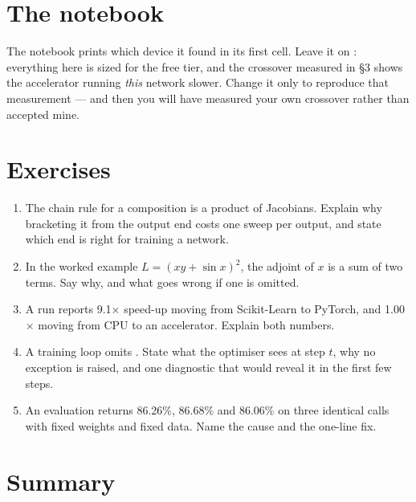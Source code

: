 \documentclass[11pt,a4paper]{article}
\begin{document}
\section{The notebook}

\begin{trybox}[title={What to change}]
The notebook prints which device it found in its first cell. Leave it on
: everything here is sized for the free tier, and the crossover
measured in \S3 shows the accelerator running \emph{this} network slower.
Change it only to reproduce that measurement --- and then you will have
measured your own crossover rather than accepted mine.
\end{trybox}

\section{Exercises}

\begin{enumerate}[leftmargin=1.6em,itemsep=4pt]
  \item The chain rule for a composition is a product of Jacobians. Explain why
        bracketing it from the output end costs one sweep per output, and state
        which end is right for training a network. \hfill \scope{[5]}
  \item In the worked example $L = (xy + \sin x)^2$, the adjoint of $x$ is a
        sum of two terms. Say why, and what goes wrong if one is omitted.
        \hfill \scope{[4]}
  \item A run reports 9.1$\times$ speed-up moving from Scikit-Learn to PyTorch,
        and 1.00$\times$ moving from CPU to an accelerator. Explain both
        numbers. \hfill \scope{[4]}
  \item A training loop omits . State what the optimiser
        sees at step $t$, why no exception is raised, and one diagnostic that
        would reveal it in the first few steps. \hfill \scope{[5]}
  \item An evaluation returns 86.26\%, 86.68\% and 86.06\% on three identical
        calls with fixed weights and fixed data. Name the cause and the
        one-line fix. \hfill \scope{[4]}
\end{enumerate}

\section*{Summary}
\end{document}
